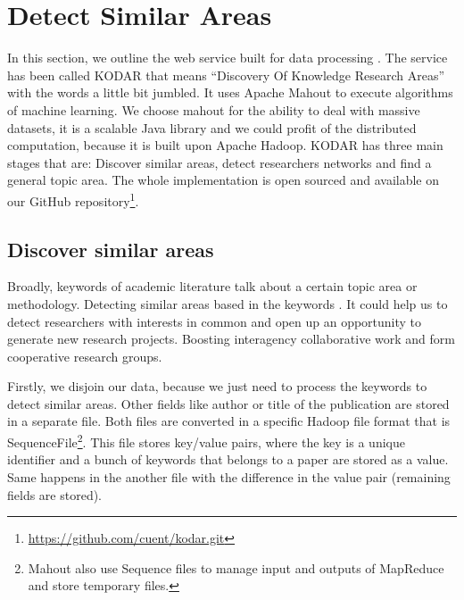 \documentclass[11pt]{article}
\begin{document}
\section{Detect Similar Areas}
\label{label:detectsimilarareas}

In this section, we outline the web service built for data processing . The service has been called KODAR that means ``Discovery Of Knowledge Research Areas'' with the words a little bit jumbled. It uses Apache Mahout to execute algorithms of machine learning. We choose mahout for the ability to deal with massive datasets, it is a scalable Java library and we could profit of the distributed computation, because it is built upon Apache Hadoop. KODAR has three main stages that are: Discover similar areas, detect researchers networks and find a general topic area. The whole implementation is open sourced and available on our GitHub repository\footnote{\url{https://github.com/cuent/kodar.git}}. 


\subsection{Discover similar areas}
\label{label:discoversimareas}

Broadly, keywords of academic literature talk about a certain topic area or methodology. Detecting similar areas based in the keywords . It could help us to detect researchers with interests in common and open up an opportunity to generate new research projects. Boosting interagency collaborative work and form cooperative research groups.

Firstly, we disjoin our data, because we just need to process the keywords to detect similar areas. Other fields like author or title of the publication are stored in a separate file. Both files are converted in a specific Hadoop file format that is SequenceFile\footnote{Mahout also use Sequence files to manage input and outputs of MapReduce and store temporary files.}. This file stores key/value pairs, where the key is a unique identifier and a bunch of keywords that belongs to a paper are stored as a value. Same happens in the another file with the difference in the value pair (remaining fields are stored). 
\end{document}

